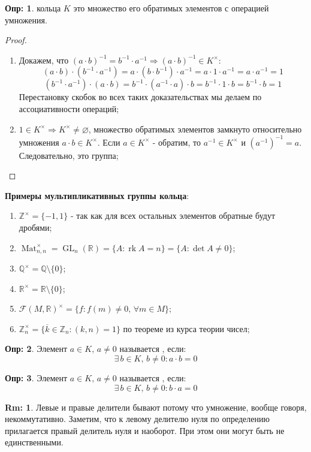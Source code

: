 \documentclass[12pt]{article}
\newcommand{\MR}{\mathbb{R}}
\newcommand{\MQ}{\mathbb{Q}}
\newcommand{\MZ}{\mathbb{Z}}
\newcommand{\MF}{\mathcal{F}}
\newcommand{\VN}{\varnothing}
\theoremstyle{definition}
\newtheorem{defn}{Опр:}
\newtheorem{rem}{Rm:}
\DeclareMathOperator{\rk}{\text{rk}}
\newcommand{\mat}[2]{\operatorname{Mat}_{#1, #2}}
\DeclareMathOperator{\GL}{\operatorname{GL}}
\begin{document}
\begin{defn}
	 кольца $K$ это множество его обратимых элементов с операцией умножения.
\end{defn}

\begin{proof}\hfill
	\begin{enumerate}[label=\arabic*)]
		\item Докажем, что $(a{\cdot}b)^{-1} = b^{-1}{\cdot}a^{-1} \Rightarrow (a{\cdot}b)^{-1} \in K^{\times}$: 
		$$
			(a{\cdot}b){\cdot}(b^{-1}{\cdot}a^{-1}) = a{\cdot}(b{\cdot}b^{-1}){\cdot}a^{-1} = a{\cdot}1{\cdot}a^{-1} = a{\cdot}a^{-1} = 1 
		$$
		$$
			(b^{-1}{\cdot}a^{-1}){\cdot}(a{\cdot}b) = b^{-1}{\cdot}(a^{-1}{\cdot}a){\cdot}b = b^{-1}{\cdot}1{\cdot}b = b^{-1}{\cdot}b = 1
		$$
		Перестановку скобок во всех таких доказательствах мы делаем по ассоциативности операций;
		\item $1 \in K^{\times} \Rightarrow K^{\times} \neq \VN$, множество обратимых элементов замкнуто относительно умножения $a{\cdot}b \in K^{\times}$. Если $a \in K^{\times}$ - обратим, то $a^{-1} \in K^{\times}$ и $(a^{-1})^{-1} = a$. Следовательно, это группа;
	\end{enumerate}
\end{proof}

\newpage

\textbf{Примеры мультипликативных группы кольца}:
\begin{enumerate}[label=\arabic*)]
	\item $\MZ^{\times} = \{-1,1\}$ - так как для всех остальных элементов обратные будут дробями;
	\item $\mat{n}{n}^{\times} = \GL_n(\MR) = \{A \colon \rk{A} = n\} = \{A \colon \det{A} \neq 0\}$;
	\item $\MQ^{\times} = \MQ \setminus \{0\}$;
	\item $\MR^{\times} = \MR \setminus \{0\}$;
	\item $\MF(M,\MR)^{\times} = \{f \colon f(m) \neq 0, \, \forall m \in M\}$;
	\item $\MZ_n^{\times} = \{\overline{k} \in \MZ_n \colon (k,n) = 1\}$ по теореме из курса теории чисел;
\end{enumerate}

\begin{defn}
	Элемент $a \in K, \, a \neq 0$ называется , если: 
	$$
		\exists \, b \in K, \, b \neq 0 \colon a{\cdot} b =0
	$$
\end{defn}
\begin{defn}
	Элемент $a \in K, \, a \neq 0$ называется , если: 
	$$
		\exists \, b \in K, \, b \neq 0 \colon b{\cdot}a =0
	$$
\end{defn}
\begin{rem}
	Левые и правые делители бывают потому что умножение, вообще говоря, некоммутативно. Заметим, что к левому делителю нуля по определению прилагается правый делитель нуля и наоборот. При этом они могут быть не единственными.
\end{rem}
\end{document}
